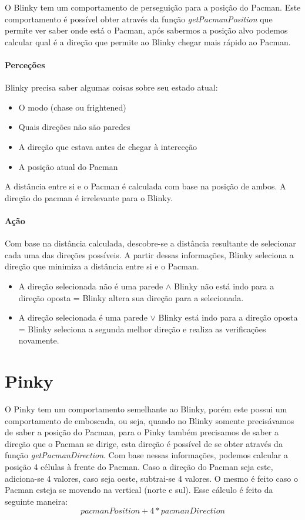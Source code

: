 \documentclass[12pt]{article}
\begin{document}
O Blinky tem um comportamento de perseguição para a posição do Pacman. Este comportamento é possível obter através da função \textit{getPacmanPosition} que permite ver saber onde está o Pacman, após sabermos a posição alvo podemos calcular qual é a direção que permite ao Blinky chegar mais rápido ao Pacman.

\paragraph*{Perceções}

Blinky precisa saber algumas coisas sobre seu estado atual:

\begin{itemize}
    \item O modo (chase ou frightened)
    \item Quais direções não são paredes
    \item A direção que estava antes de chegar à interceção
    \item A posição atual do Pacman
\end{itemize}

A distância entre si e o Pacman é calculada com base na posição de ambos. A direção do pacman é irrelevante para o Blinky.

\paragraph*{Ação} 
Com base na distância calculada, descobre-se a distância resultante de selecionar cada uma das direções possíveis. A partir dessas informações, Blinky seleciona a direção que minimiza a distância entre si e o Pacman.

\begin{itemize}
    \item A direção selecionada não é uma parede $\land$ Blinky não está indo para a direção oposta = Blinky altera sua direção para a selecionada.
    
    \item A direção selecionada é uma parede $\lor$ Blinky está indo para a direção oposta = Blinky seleciona a segunda melhor direção e realiza as verificações novamente.
\end{itemize}

\section*{Pinky}
O Pinky tem um comportamento semelhante ao Blinky, porém este possui um comportamento de emboscada, ou seja, quando no Blinky somente precisávamos de saber a posição do Pacman, para o Pinky também precisamos de saber a direção que o Pacman se dirige, esta direção é possível de se obter através da função \textit{getPacmanDirection}. Com base nessas informações, podemos calcular a posição 4 células à frente do Pacman. Caso a direção do Pacman seja este, adiciona-se 4 valores, caso seja oeste, subtrai-se 4 valores. O mesmo é feito caso o Pacman esteja se movendo na vertical (norte e sul). Esse cálculo é feito da seguinte maneira: 
\[ pacmanPosition + 4 * pacmanDirection\]
\end{document}
